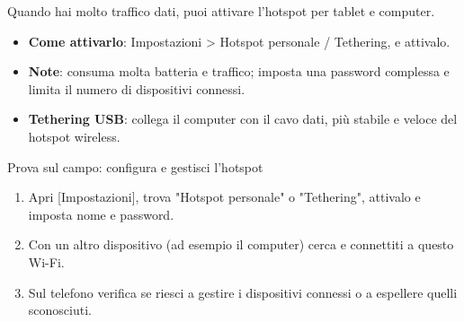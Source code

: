 
Quando hai molto traffico dati, puoi attivare l'hotspot per tablet e computer.

\begin{itemize}
  \item \textbf{Come attivarlo}: Impostazioni > Hotspot personale / Tethering, e attivalo.
  \item \textbf{Note}: consuma molta batteria e traffico; imposta una password complessa e limita il numero di dispositivi connessi.
  \item \textbf{Tethering USB}: collega il computer con il cavo dati, più stabile e veloce del hotspot wireless.
\end{itemize}

\begin{tcbpractice}{Prova sul campo: configura e gestisci l'hotspot}
\begin{enumerate}
  \item Apri [Impostazioni], trova "Hotspot personale" o "Tethering", attivalo e imposta nome e password.
  \item Con un altro dispositivo (ad esempio il computer) cerca e connettiti a questo Wi-Fi.
  \item Sul telefono verifica se riesci a gestire i dispositivi connessi o a espellere quelli sconosciuti.
\end{enumerate}

\end{tcbpractice}
